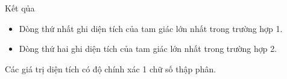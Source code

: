 Kết qủa
\begin{itemize}
	\item     Dòng thứ nhất ghi diện tích của tam giác lớn nhất trong trường hợp 1.   
	\item     Dòng thứ hai ghi diện tích của tam giác lớn nhất trong trường hợp 2.   
\end{itemize}

   Các giá trị diện tích có độ chính xác 1 chữ số thập phân.